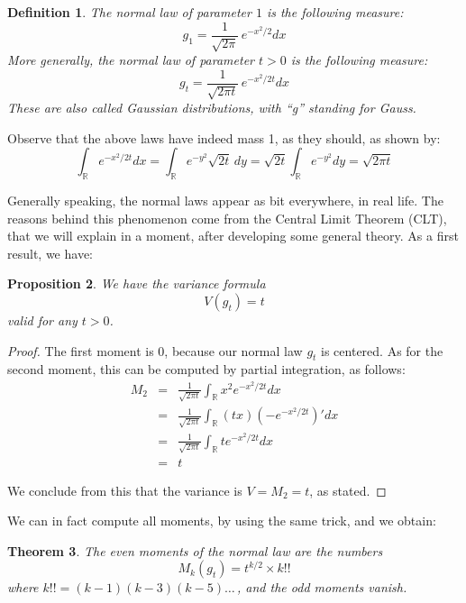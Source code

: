 \documentclass[12pt]{amsbook}
\newtheorem{theorem}{Theorem}[chapter]
\newtheorem{definition}[theorem]{Definition}
\newtheorem{proposition}[theorem]{Proposition}
\begin{document}

\begin{definition}
The normal law of parameter $1$ is the following measure:
$$g_1=\frac{1}{\sqrt{2\pi}}\,e^{-x^2/2}dx$$
More generally, the normal law of parameter $t>0$ is the following measure:
$$g_t=\frac{1}{\sqrt{2\pi t}}\,e^{-x^2/2t}dx$$
These are also called Gaussian distributions, with ``g'' standing for Gauss.
\end{definition}

Observe that the above laws have indeed mass 1, as they should, as shown by:
$$\int_\mathbb R e^{-x^2/2t}dx
=\int_\mathbb R e^{-y^2}\sqrt{2t}\,dy
=\sqrt{2t}\int_\mathbb R e^{-y^2}dy
=\sqrt{2\pi t}$$

Generally speaking, the normal laws appear as bit everywhere, in real life. The reasons behind this phenomenon come from the Central Limit Theorem (CLT), that we will explain in a moment, after developing some general theory. As a first result, we have:

\begin{proposition}
We have the variance formula
$$V(g_t)=t$$
valid for any $t>0$.
\end{proposition}

\begin{proof}
The first moment is 0, because our normal law $g_t$ is centered. As for the second moment, this can be computed by partial integration, as follows:
\begin{eqnarray*}
M_2
&=&\frac{1}{\sqrt{2\pi t}}\int_\mathbb Rx^2e^{-x^2/2t}dx\\
&=&\frac{1}{\sqrt{2\pi t}}\int_\mathbb R(tx)\left(-e^{-x^2/2t}\right)'dx\\
&=&\frac{1}{\sqrt{2\pi t}}\int_\mathbb Rte^{-x^2/2t}dx\\
&=&t
\end{eqnarray*}

We conclude from this that the variance is $V=M_2=t$, as stated.
\end{proof}

We can in fact compute all moments, by using the same trick, and we obtain:

\begin{theorem}
The even moments of the normal law are the numbers
$$M_k(g_t)=t^{k/2}\times k!!$$
where $k!!=(k-1)(k-3)(k-5)\ldots\,$, and the odd moments vanish. 
\end{theorem}
\end{document}
